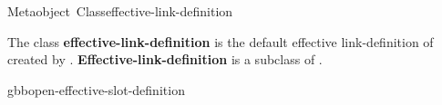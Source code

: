 \documentclass[10pt,twoside,english,pdftex]{article}
\begin{document}

\begin{functiondoc}{Metaobject~Class}{effective-link-definition}{}
%

\fnsyntax

\fnpackage {}

\fnmodule {}

\fndescription The class \textbf{effective-link-definition} is the default
effective link-definition  of 
created by \textbf{}.
\textbf{Effective-link-definition} is a subclass of
\textbf{}.

\begin{alsos}{gbbopen-effective-slot-definition}
\end{alsos}

\end{functiondoc}

\end{document}
